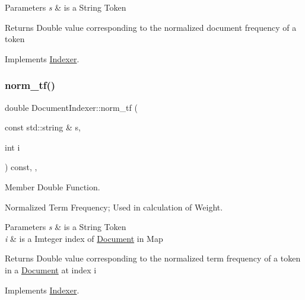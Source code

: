 \begin{DoxyParams}{Parameters}
{\em s} & is a String Token \\
\hline
\end{DoxyParams}
\begin{DoxyReturn}{Returns}
Double value corresponding to the normalized document frequency of a token 
\end{DoxyReturn}


Implements \hyperlink{class_indexer_af71c69a4267217969f21cba44822f263}{Indexer}.

\mbox{\label{class_document_indexer_a91cbacd5c82134b2ba6ab79e06fa4a60}} 
\subsubsection{\texorpdfstring{norm\+\_\+tf()}{norm\_tf()}}
{\footnotesize\ttfamily double Document\+Indexer\+::norm\+\_\+tf (\begin{DoxyParamCaption}\item[{const std\+::string \&}]{s,  }\item[{int}]{i }\end{DoxyParamCaption}) const\hspace{0.3cm}{\ttfamily [override]}, {\ttfamily [private]}, {\ttfamily [virtual]}}



Member Double Function. 

Normalized Term Frequency; Used in calculation of Weight.


\begin{DoxyParams}{Parameters}
{\em s} & is a String Token \\
\hline
{\em i} & is a Imteger index of \hyperlink{class_document}{Document} in Map \\
\hline
\end{DoxyParams}
\begin{DoxyReturn}{Returns}
Double value corresponding to the normalized term frequency of a token in a \hyperlink{class_document}{Document} at index i 
\end{DoxyReturn}


Implements \hyperlink{class_indexer_aadcdca40938d27c465e564ac8852f02d}{Indexer}.

\mbox{\label{class_document_indexer_a5e0aeb92576847e9462670693cb0737c}} 
